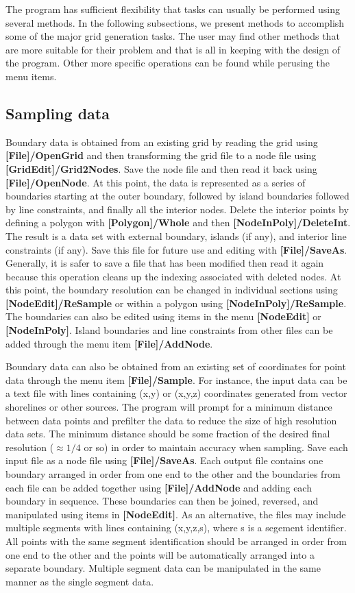 \documentclass{article}
\begin{document}
The program has sufficient flexibility that tasks can usually be performed using several methods. In the following 
subsections, we present methods to accomplish some of the major grid generation tasks. The user may find other 
methods that are more suitable for their problem and that is all in keeping with the design of the program. Other
more specific operations can be found while perusing the menu items. 

\subsection{Sampling data}

Boundary data is obtained from an existing grid by reading the grid using \textbf{[File]/OpenGrid} and then
transforming the grid file to a node file using \textbf{[GridEdit]/Grid2Nodes}. Save the node file and then read it back using 
\textbf{[File]/OpenNode}. At this point, the data is represented as a series of boundaries starting at the outer
boundary, followed by island boundaries followed by  line constraints, and finally all the interior nodes. Delete the
 interior points by defining a polygon with \textbf{[Polygon]/Whole} and then \textbf{[NodeInPoly]/DeleteInt}.
The result is a data set with external boundary, islands (if any), and interior line constraints (if any). Save this file
for future use and editing with \textbf{[File]/SaveAs}. Generally, it is safer to save a file that has been modified then
read it again because this operation cleans up the indexing associated with deleted nodes. At this point, the boundary 
resolution can be changed in individual sections using \textbf{[NodeEdit]/ReSample} or within a polygon using 
\textbf{[NodeInPoly]/ReSample}. The boundaries can also be edited using items in the menu \textbf{[NodeEdit]} or
\textbf{[NodeInPoly]}. Island boundaries and line constraints from other files can be added through the menu item
\textbf{[File]/AddNode}.

Boundary data can also be obtained from an existing set of coordinates for point data through the menu item
\textbf{[File]/Sample}. For instance, the input data can be a text file with lines containing (x,y) or (x,y,z) coordinates
generated from vector shorelines or other sources. The program will prompt for a minimum distance between data
points and prefilter the data to reduce the size of high resolution data sets. The minimum distance should be some
fraction of the desired final resolution ($\approx 1/4$ or so) in order to maintain accuracy when sampling. 
Save each input file as a node file using \textbf{[File]/SaveAs}. Each output file
contains one boundary arranged in order from one end to the other and the boundaries from each file can be 
added together using \textbf{[File]/AddNode} and adding each boundary in sequence.
These boundaries can then be joined, reversed, and manipulated using items in \textbf{[NodeEdit]}.
As an alternative, the files may include multiple segments with lines containing (x,y,z,s), where s is a segement
identifier. All points with the same segment identification should be arranged in order from one end to the other
and the points will be automatically arranged into a separate boundary. Multiple segment data can be manipulated
 in the same manner as the single segment data.
 
\end{document}
